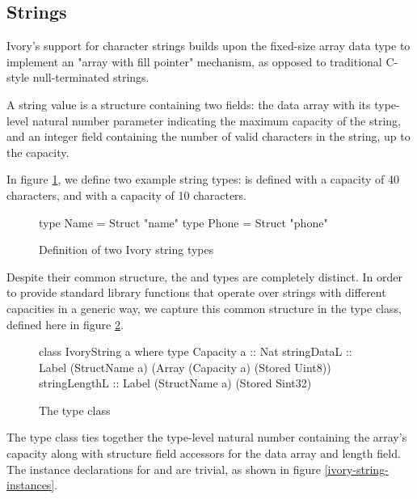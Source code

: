 \subsection{Strings}
Ivory's support for character strings builds upon the fixed-size array
data type to implement an "array with fill pointer" mechanism, as opposed
to traditional C-style null-terminated strings.

A string value is a structure containing two fields: the data array
with its type-level natural number parameter indicating the maximum
capacity of the string, and an integer field containing the number of
valid characters in the string, up to the capacity.

In figure \ref{ivory-string-type-defn}, we define two example
string types:  is defined with a capacity of 40
characters, and  with a capacity of 10 characters.

\begin{figure}[h]
\begin{code}

type Name  = Struct "name"
type Phone = Struct "phone"
\end{code}
\caption{Definition of two Ivory string types}
\label{ivory-string-type-defn}
\end{figure}

Despite their common structure, the  and  types
are completely distinct. In order to provide standard library
functions that operate over strings with different capacities in a generic
way, we capture this common structure in the  type
class, defined here in figure \ref{ivory-string-class}.

\begin{figure}[h]
\begin{code}
class IvoryString a where
  type Capacity a :: Nat
  stringDataL   :: Label (StructName a)
                         (Array (Capacity a)
                                (Stored Uint8))
  stringLengthL :: Label (StructName a)
                         (Stored Sint32)
\end{code}
\caption{The  type class}
\label{ivory-string-class}
\end{figure}

The  type class ties together the type-level natural
number containing the array's capacity along with structure field accessors
for the data array and length field. The instance declarations for 
and  are trivial, as shown in figure \ref{ivory-string-instances}.

